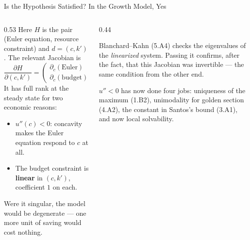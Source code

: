 \begin{frame}{Is the Hypothesis Satisfied? In the Growth Model, Yes}
\begin{columns}[T]
\begin{column}{0.53\textwidth}
\small
Here $H$ is the pair (Euler equation, resource constraint) and $d=(c,k')$. The relevant Jacobian is
\[
\frac{\partial H}{\partial (c,k')}=
\begin{pmatrix}
\partial_c(\text{Euler}) & \partial_{k'}(\text{Euler}) \\[2pt]
\partial_c(\text{budget}) & \partial_{k'}(\text{budget})
\end{pmatrix}.
\]
It has full rank at the steady state for two economic reasons:
\medskip
\begin{itemize}\small
  \item $u''(c)<0$: concavity makes the Euler equation respond to $c$ at all.
  \item The budget constraint is \textbf{linear} in $(c,k')$, coefficient $1$ on each.
\end{itemize}
\medskip
Were it singular, the model would be degenerate --- one more unit of saving would cost nothing.
\end{column}
\begin{column}{0.44\textwidth}
\begin{conceptbox}[title=\textbf{Where it returns}]\footnotesize
Blanchard--Kahn (5.A4) checks the eigenvalues of the \emph{linearized} system. Passing it confirms, after the fact, that this Jacobian was invertible --- the same condition from the other end.
\end{conceptbox}
\medskip
\begin{examplebox}\footnotesize
$u''<0$ has now done four jobs: uniqueness of the maximum (1.B2), unimodality for golden section (4.A2), the constant in Santos's bound (3.A1), and now local solvability.
\end{examplebox}
\end{column}
\end{columns}
\vspace{1mm}
\end{frame}

